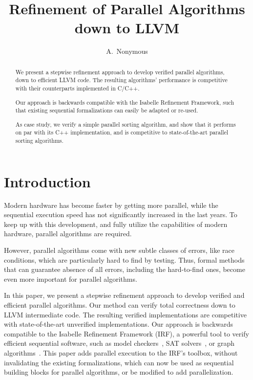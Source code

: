 \documentclass[runningheads]{llncs}
\begin{document}
\title{Refinement of Parallel Algorithms down to LLVM}


\author{A.~Nonymous}
%


\maketitle

\begin{abstract}
  We present a stepwise refinement approach to develop
  verified parallel algorithms, down to efficient LLVM code.
  The resulting algorithms' performance is competitive with their
  counterparts implemented in C/C++.

  Our approach is backwards compatible with the Isabelle Refinement Framework,
  such that existing sequential formalizations can easily be adapted
  or re-used.

  As case study, we verify a simple parallel sorting algorithm, and
  show that it performs on par with its C++ implementation,
  and is competitive to state-of-the-art parallel sorting algorithms.
\end{abstract}


\section{Introduction}
Modern hardware has become faster by getting more parallel, while the
sequential execution speed has not significantly increased in the last years.
To keep up with this development, and fully utilize the capabilities of modern hardware,
parallel algorithms are required.

However, parallel algorithms come with new subtle classes of errors, like race conditions,
which are particularly hard to find by testing. Thus, formal methods that can guarantee
absence of all errors, including the hard-to-find ones, become even more important for
parallel algorithms.

In this paper, we present a stepwise refinement approach to develop
verified and efficient parallel algorithms. Our method can verify total correctness down to LLVM intermediate code.
The resulting verified implementations are competitive with state-of-the-art
unverified implementations. Our approach is backwards compatible to
the Isabelle Refinement Framework (IRF), a powerful tool to verify efficient sequential software,
such as model checkers~\cite{ELNN13,BrLa18,WiLa18}, SAT solvers~\cite{La17_CADE,La17_SAT,FBL18},
or graph algorithms~\cite{La14,LaSe16,LaSe19}.
This paper adds parallel execution to the IRF's toolbox, without invalidating the existing formalizations,
which can now be used as sequential building blocks for parallel algorithms, or be modified to add
parallelization.
\end{document}
